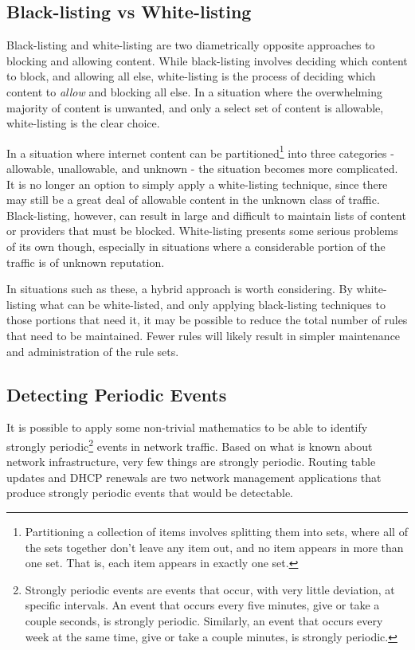 \documentclass{article}
\theoremstyle{remark}
\theoremstyle{definition}
\theoremstyle{definition}
\theoremstyle{definition}
\begin{document}
\subsection{Black-listing vs White-listing}
Black-listing and white-listing are two diametrically opposite approaches to blocking and allowing content. While black-listing involves deciding which content to block, and allowing all else, white-listing is the process of deciding which content to \emph{allow} and blocking all else. In a situation where the overwhelming majority of content is unwanted, and only a select set of content is allowable, white-listing is the clear choice.

In a situation where internet content can be partitioned\footnote{Partitioning a collection of items involves splitting them into sets, where all of the sets together don't leave any item out, and no item appears in more than one set. That is, each item appears in exactly one set.}  into three categories - allowable, unallowable, and unknown - the situation becomes more complicated. It is no longer an option to simply apply a white-listing technique, since there may still be a great deal of allowable content in the unknown class of traffic. Black-listing, however, can result in large and difficult to maintain lists of content or providers that must be blocked. White-listing presents some serious problems of its own though, especially in situations where a considerable portion of the traffic is of unknown reputation.

In situations such as these, a hybrid approach is worth considering. By white-listing what can be white-listed, and only applying black-listing techniques to those portions that need it, it may be possible to reduce the total number of rules that need to be maintained. Fewer rules will likely result in simpler maintenance and administration of the rule sets.

\subsection{Detecting Periodic Events}
It is possible to apply some non-trivial mathematics to be able to identify strongly periodic\footnote{Strongly periodic events are events that occur, with very little deviation, at specific intervals. An event that occurs every five minutes, give or take a couple seconds, is strongly periodic. Similarly, an event that occurs every week at the same time, give or take a couple minutes, is strongly periodic.} events in network traffic. Based on what is known about network infrastructure, very few things are strongly periodic. Routing table updates and DHCP renewals are two network management applications that produce strongly periodic events that would be detectable.
\end{document}
